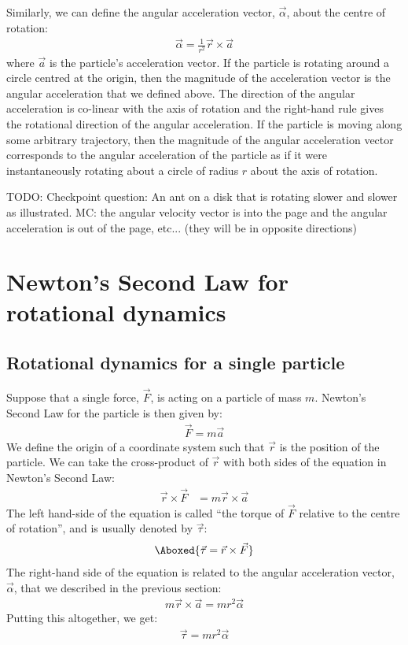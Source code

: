 Similarly, we can define the angular acceleration vector, $\vec \alpha$, about the centre of rotation:
\begin{align}
\vec \alpha = \frac{1}{r^2}\vec r \times \vec a
\end{align}
where $\vec a$ is the particle's acceleration vector. If the particle is rotating around a circle centred at the origin, then the magnitude of the acceleration vector is the angular acceleration that we defined above. The direction of the angular acceleration is co-linear with the axis of rotation and the right-hand rule gives the rotational direction of the angular acceleration. If the particle is moving along some arbitrary trajectory, then the magnitude of the angular acceleration vector corresponds to the angular acceleration of the particle as if it were instantaneously rotating about a circle of radius $r$ about the axis of rotation.

TODO: Checkpoint question: An ant on a disk that is rotating slower and slower as illustrated. MC: the angular velocity vector is into the page and the angular acceleration is out of the page, etc... (they will be in opposite directions) 

\section{Newton's Second Law for rotational dynamics}
\subsection{Rotational dynamics for a single particle}
Suppose that a single force, $\vec F$, is acting on a particle of mass $m$.  Newton's Second Law for the particle is then given by:
\begin{align*}
\vec F = m \vec a
\end{align*}
We define the origin of a coordinate system such that $\vec r$ is the position of the particle. We can take the cross-product of $\vec r$ with both sides of the equation in Newton's Second Law:
\begin{align*}
\vec r \times \vec F &= m \vec r \times \vec a
\end{align*}
The left hand-side of the equation is called ``the torque of $\vec F$ relative to the centre of rotation'', and is usually denoted by $\vec \tau$:
\begin{align}
\Aboxed{\vec \tau = \vec r \times \vec F}
\end{align}
The right-hand side of the equation is related to the angular acceleration vector, $\vec \alpha$, that we described in the previous section:
\begin{align*}
 m \vec r \times \vec a = mr^2\vec\alpha
\end{align*}
Putting this altogether, we get:
\begin{align*}
\vec\tau = mr^2 \vec\alpha
\end{align*}

